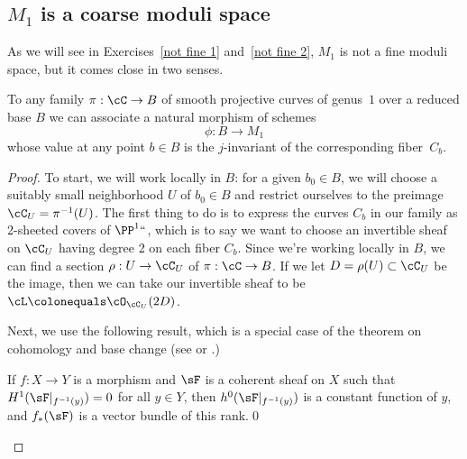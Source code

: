 \subsection*{$M_1$ is a coarse moduli space}

 As we will see in Exercises~\ref{not fine 1} and~\ref{not fine 2},
$M_1$ is not a fine moduli space, but it comes close in two senses.

\begin{proposition}\label{M1 is coarse}
To any family $\pi : \cC \to B$  of smooth projective curves of
genus~$1$ over a reduced base $B$ we can associate a natural morphism of
schemes $$\phi : B \to M_1$$ whose value at any point $b \in B$ is the
$j$-invariant of the corresponding fiber~$C_b$.
\end{proposition}

\begin{proof}
To start, we will work locally in $B$: for a given $b_0 \in B$, we
will choose a suitably small neighborhood $U$ of $b_0 \in B$ and
restrict ourselves to the preimage $\cC_U = \pi^{-1}(U)$. The first
thing to do is to express the curves $C_b$ in our family as
2-sheeted covers
of $\PP^1` `$, which is to say we want to choose an invertible sheaf
on $\cC_U$ having degree 2 on each fiber $C_b$. Since we're working
locally in $B$,
we can find a section $\rho : U \to \cC_U$ of $\pi : \cC \to B$. If we let $D = \rho(U) \subset \cC_U$ be the image, then we can take our invertible sheaf to be $\cL \colonequals  \cO_{\cC_U}(2D)$.

Next, we use the following result, which is a special case of the theorem on cohomology and base change
(see  \cite[Appendix, Theorems B.5 and B.9]{3264} or
\cite[Theorem 12.11]{Hartshorne1977}.)

\begin{theorem}
If $f: X\to Y$ is a morphism and $\sF$ is
%
%
a coherent sheaf on $X$ such that $H^{1}(\sF|_{f^{-1}(y)})= 0$ for all $y\in Y$, then
$h^{0}(\sF|_{f^{-1}(y)})$ is a constant function of $y$, and
$f_{*}(\sF)$ is a vector bundle of this rank.\qed
\end{theorem}


\end{proof}
